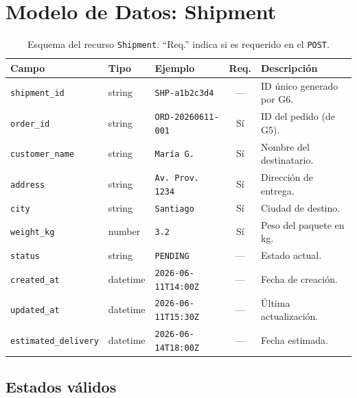 \documentclass[11pt, a4paper]{article}
\begin{document}
\section{Modelo de Datos: Shipment}
\label{sec:modelo}

\begin{table}[h!]
\centering
\renewcommand{\arraystretch}{1.3}
\begin{tabularx}{\textwidth}{l l l c X}
  \toprule
  \textbf{Campo} & \textbf{Tipo} & \textbf{Ejemplo} & \textbf{Req.} & \textbf{Descripción} \\
  \midrule
  \texttt{shipment\_id}        & string   & \texttt{SHP-a1b2c3d4}        & ---  & ID único generado por G6. \\
  \texttt{order\_id}           & string   & \texttt{ORD-20260611-001}     & Sí   & ID del pedido (de G5). \\
  \texttt{customer\_name}      & string   & \texttt{María G.}             & Sí   & Nombre del destinatario. \\
  \texttt{address}             & string   & \texttt{Av. Prov. 1234}       & Sí   & Dirección de entrega. \\
  \texttt{city}                & string   & \texttt{Santiago}             & Sí   & Ciudad de destino. \\
  \texttt{weight\_kg}          & number   & \texttt{3.2}                  & Sí   & Peso del paquete en kg. \\
  \texttt{status}              & string   & \texttt{PENDING}              & ---  & Estado actual. \\
  \texttt{created\_at}         & datetime & \texttt{2026-06-11T14:00Z}    & ---  & Fecha de creación. \\
  \texttt{updated\_at}         & datetime & \texttt{2026-06-11T15:30Z}    & ---  & Última actualización. \\
  \texttt{estimated\_delivery} & datetime & \texttt{2026-06-14T18:00Z}    & ---  & Fecha estimada. \\
  \bottomrule
\end{tabularx}
\caption{Esquema del recurso \texttt{Shipment}. ``Req.'' indica si es requerido en el \texttt{POST}.}
\end{table}


\subsection{Estados válidos}
\label{sec:estados}
\end{document}
